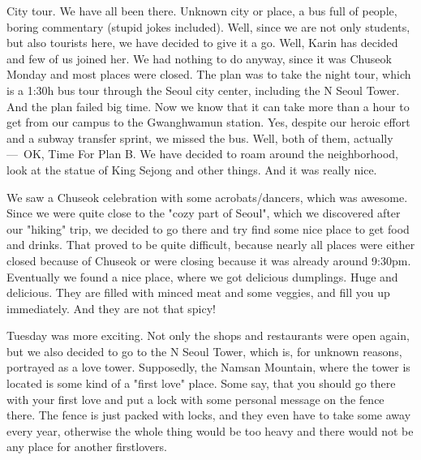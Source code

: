 \begin{post}
	\begin{content}
City tour. We have all been there. Unknown city or place, a bus full of people, boring commentary (stupid jokes included). Well, since we are not only students, but also tourists here, we have decided to give it a go. Well, Karin has decided and few of us joined her. We had nothing to do anyway, since it was Chuseok Monday and most places were closed. The plan was to take the night tour, which is a 1:30h bus tour through the Seoul city center, including the N Seoul Tower. And the plan failed big time. Now we know that it can take more than a hour to get from our campus to the Gwanghwamun station. Yes, despite our heroic effort and a subway transfer sprint, we missed the bus. Well, both of them, actually — OK, Time For Plan B. We have decided to roam around the neighborhood, look at the statue of King Sejong and other things. And it was really nice.


We saw a Chuseok celebration with some acrobats/dancers, which was awesome. Since we were quite close to the "cozy part of Seoul", which we discovered after our "hiking" trip, we decided to go there and try find some nice place to get food and drinks. That proved to be quite difficult, because nearly all places were either closed because of Chuseok or were closing because it was already around 9:30pm. Eventually we found a nice place, where we got delicious dumplings. Huge and delicious. They are filled with minced meat and some veggies, and fill you up immediately. And they are not that spicy!

Tuesday was more exciting. Not only the shops and restaurants were open again, but we also decided to go to the N Seoul Tower, which is, for unknown reasons, portrayed as a love tower. Supposedly, the Namsan Mountain, where the tower is located is some kind of a "first love" place. Some say, that you should go there with your first love and put a lock with some personal message on the fence there. The fence is just packed with locks, and they even have to take some away every year, otherwise the whole thing would be too heavy and there would not be any place for another firstlovers.


\end{content}
\end{post}
